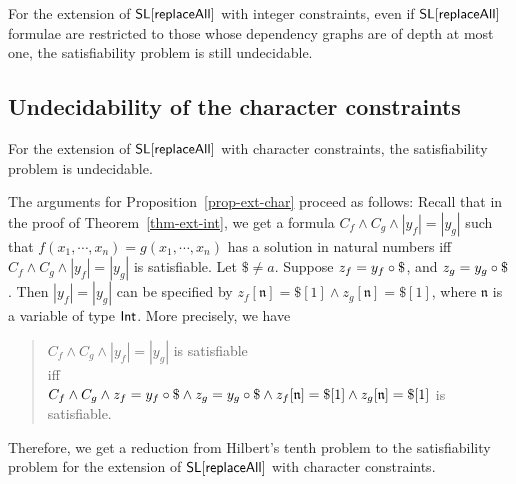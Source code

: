 \begin{theorem}\label{thm-ext-int-strong}
	For the extension of $\mathsf{SL}[\mathsf{replaceAll}]$ with integer constraints, even if $\mathsf{SL}[\mathsf{replaceAll}]$ formulae are restricted to those whose dependency graphs are of depth at most one, the satisfiability problem is still undecidable.
\end{theorem}

%	
%	

\subsection{Undecidability of the character constraints}

\begin{proposition}\label{prop-ext-char}
	For the extension of $\mathsf{SL}[\mathsf{replaceAll}]$ with character constraints, the satisfiability problem is undecidable. 
\end{proposition}

The arguments for Proposition~\ref{prop-ext-char} proceed as follows: 
Recall that in the proof of Theorem~\ref{thm-ext-int}, we get a formula $C_f \wedge C_g \wedge |y_f| = |y_g|$ such that $f(x_1,\cdots, x_n) = g(x_1,\cdots, x_n)$ has a solution in natural numbers iff $C_f \wedge C_g \wedge |y_f| = |y_g|$ is satisfiable. Let $\$ \neq a$. Suppose  $z_f = y_f \concat \$$, and $z_g = y_g \concat \$$. Then $|y_f| = |y_g|$ can be specified by $z_f[\mathfrak{n}] = \$[1] \wedge  z_g[\mathfrak{n}] = \$[1]$, where $\mathfrak{n}$ is a variable of type ${\sf Int}$. More precisely, 
%
we have 
\begin{quote}
\centering
$C_f \wedge C_g \wedge |y_f|= |y_g|$ is satisfiable \\
%
iff \\
%
$C_f \wedge C_g \wedge z_f = y_f \circ \$ \wedge z_g = y_g \circ \$ \wedge z_f[\mathfrak{n}] = \$[1] \wedge  z_g[\mathfrak{n}] = \$[1]$ is satisfiable. 
\end{quote}
Therefore, we get a reduction from Hilbert's tenth problem to the satisfiability problem for the extension of $\mathsf{SL}[\mathsf{replaceAll}]$ with character constraints. 

